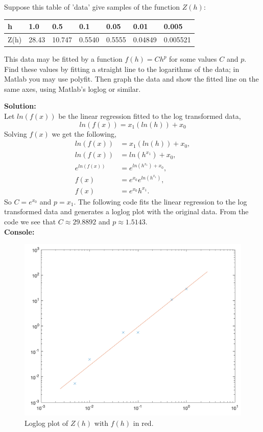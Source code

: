 \documentclass[12pt]{article}
\makeatletter
\theoremstyle{homework}
\newenvironment{exercise}[1]
{\def\@currentlabel{#1}\exercisecore}
{\endexercisecore}
\newcommand{\localhead}[1]{\par\smallskip\noindent\textbf{#1}\nobreak\\}%
\newcommand\solution{\localhead{Solution:}}
\makeatother
\begin{document}
\begin{exercise}{Problem P7} Suppose this table of 'data' give samples of the function $Z(h)$:
  \begin{center}
    \begin{tabular}{ l |l| l| l| l| l |l}
    h& 1.0 &0.5& 0.1& 0.05& 0.01 & 0.005\\
    \hline
    Z(h)& 28.43 &10.747& 0.5540& 0.5555& 0.04849 & 0.005521
    \end{tabular}
    \end{center}
  
  This data may be fitted by a function $f(h) = Ch^p$ for some values $C$ and $p$. Find these values by 
  fitting a straight line to the logarithms of the data; in Matlab you may use polyfit. Then graph the data and show the 
  fitted line on the same axes, using Matlab's loglog or similar.
  \solution Let $ln(f(x))$ be the linear regression fitted to the log transformed data, 
  \begin{equation*}
    ln(f(x)) = x_1 (ln(h)) + x_0
  \end{equation*}
  Solving $f(x)$ we get the following, 
  \begin{align*}
    ln(f(x)) &= x_1 (ln(h)) + x_0,\\
    ln(f(x)) &= ln(h^{x_1}) + x_0,\\
    e^{ln(f(x))} &= e^{ln(h^{x_1}) + x_0},\\
    f(x) &= e^{x_0}e^{ln(h^{x_1})},\\
    f(x) &= e^{x_0}h^{x_1}.
  \end{align*}
  So $C = e^{x_0}$ and $p = x_1$. The following code fits the linear regression to the log transformed data and 
  generates a loglog plot with the original data. From the code we see that $C \approx 29.8892$ and $p\approx 1.5143$.\\
  \textbf{Console:}
  \begin{center}
    
  \end{center}


  \begin{figure}[H]
    \begin{center}
      \caption{Loglog plot of $Z(h)$ with $f(h)$ in red.}
      \includegraphics[width=.80\textwidth]{r2.png}
    \end{center}
  \end{figure}

\end{exercise}
\end{document}
